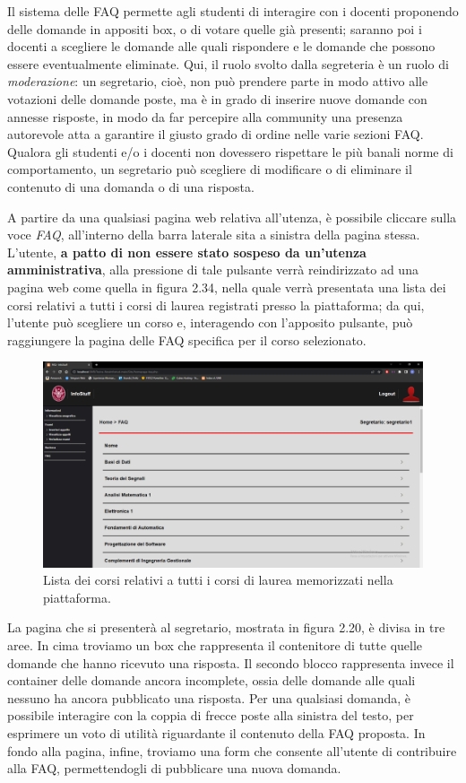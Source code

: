 \documentclass [a4paper,11pt]{book}
\begin{document}
Il sistema delle FAQ permette agli studenti di interagire con i docenti proponendo delle domande in appositi box, o di votare quelle già presenti; saranno poi i docenti a scegliere le domande alle quali rispondere e le domande che possono essere eventualmente eliminate. Qui, il ruolo svolto dalla segreteria è un ruolo di \emph{moderazione}: un segretario, cioè, non può prendere parte in modo attivo alle votazioni delle domande poste, ma è in grado di inserire nuove domande con annesse risposte, in modo da far percepire alla community una presenza autorevole atta a garantire il giusto grado di ordine nelle varie sezioni FAQ. Qualora gli studenti e/o i docenti non dovessero rispettare le più banali norme di comportamento, un segretario può scegliere di modificare o di eliminare il contenuto di una domanda o di una risposta.

A partire da una qualsiasi pagina web relativa all'utenza, è possibile cliccare sulla voce \emph{FAQ}, all'interno della barra laterale sita a sinistra della pagina stessa. L'utente, \textbf{a patto di non essere stato sospeso da un'utenza amministrativa}, alla pressione di tale pulsante verrà reindirizzato ad una pagina web come quella in figura 2.34, nella quale verrà presentata una lista dei corsi relativi a tutti i corsi di laurea registrati presso la piattaforma; da qui, l'utente può scegliere un corso e, interagendo con l'apposito pulsante, può raggiungere la pagina delle FAQ specifica per il corso selezionato.

\begin{figure}
\centering
\includegraphics[scale=0.3]{figura2-34.png}
\caption{Lista dei corsi relativi a tutti i corsi di laurea memorizzati nella piattaforma.}
\end{figure}

La pagina che si presenterà al segretario, mostrata in figura 2.20, è divisa in tre aree. In cima troviamo un box che rappresenta il contenitore di tutte quelle domande che hanno ricevuto una risposta. Il secondo blocco rappresenta invece il container delle domande ancora incomplete, ossia delle domande alle quali nessuno ha ancora pubblicato una risposta. Per una qualsiasi domanda, è possibile interagire con la coppia di frecce poste alla sinistra del testo, per esprimere un voto di utilità riguardante il contenuto della FAQ proposta. In fondo alla pagina, infine, troviamo una form che consente all'utente di contribuire alla FAQ, permettendogli di pubblicare una nuova domanda. 
\end{document}
